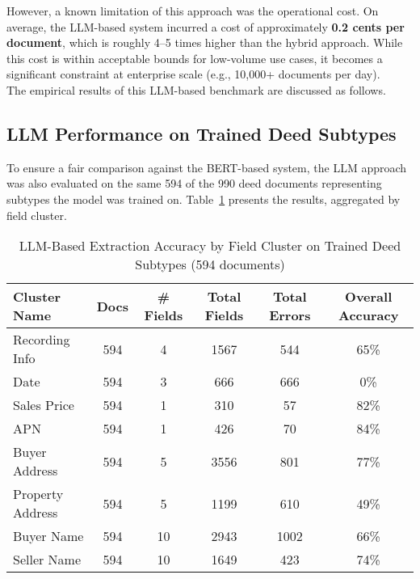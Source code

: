 \documentclass{article}
\begin{document}
However, a known limitation of this approach was the operational cost. On average, the LLM-based system incurred a cost of approximately \textbf{0.2 cents per document}, which is roughly 4--5 times higher than the hybrid approach. While this cost is within acceptable bounds for low-volume use cases, it becomes a significant constraint at enterprise scale (e.g., 10,000+ documents per day). \\

The empirical results of this LLM-based benchmark are discussed as follows.

\subsection{LLM Performance on Trained Deed Subtypes}

To ensure a fair comparison against the BERT-based system, the LLM approach was also evaluated on the same 594 of the 990 deed documents representing subtypes the model was trained on. Table~\ref{tab:llm_accuracy_trained} presents the results, aggregated by field cluster.

\vspace{2mm}

\begin{table}[H]
\centering
\footnotesize
\renewcommand{\arraystretch}{1.2}
\begin{tabular}{|l|c|c|c|c|c|}
\hline
\textbf{Cluster Name} & \textbf{Docs} & \textbf{\# Fields} & \textbf{Total Fields} & \textbf{Total Errors} & \textbf{Overall Accuracy} \\
\hline
Recording Info       & 594 & 4  & 1567 & 544 & 65\% \\
Date                 & 594 & 3  & 666  & 666 & 0\%  \\
Sales Price          & 594 & 1  & 310  & 57  & 82\% \\
APN                  & 594 & 1  & 426  & 70  & 84\% \\
Buyer Address        & 594 & 5  & 3556 & 801 & 77\% \\
Property Address     & 594 & 5  & 1199 & 610 & 49\% \\
Buyer Name           & 594 & 10 & 2943 & 1002 & 66\% \\
Seller Name          & 594 & 10 & 1649 & 423  & 74\% \\
\hline
\end{tabular}
\caption{LLM-Based Extraction Accuracy by Field Cluster on Trained Deed Subtypes (594 documents)}
\label{tab:llm_accuracy_trained}
\end{table}
\end{document}
